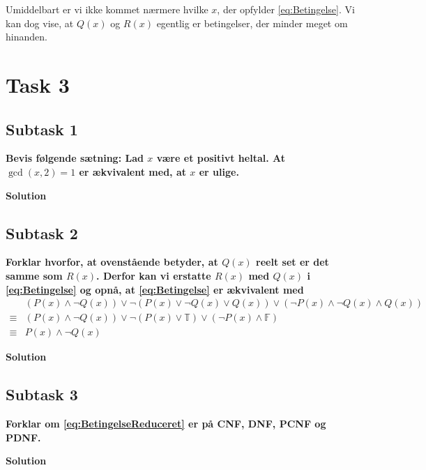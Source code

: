 Umiddelbart er vi ikke kommet nærmere hvilke $x$, der opfylder \eqref{eq:Betingelse}. Vi kan dog vise, at $Q(x)$ og $R(x)$ egentlig er betingelser, der minder meget om hinanden.


\section{Task 3}
\subsection{Subtask 1}
\noindent
\textbf{Bevis følgende sætning: Lad $x$ være et positivt heltal. At $\gcd(x,2)=1$ er ækvivalent med, at $x$ er ulige.}

\bigskip
\noindent
\textbf{Solution}

\subsection{Subtask 2}
\noindent
\textbf{Forklar hvorfor, at ovenstående betyder, at $Q(x)$ reelt set er det samme som $R(x)$. Derfor kan vi erstatte $R(x)$ med $Q(x)$ i \eqref{eq:Betingelse} og opnå, at \eqref{eq:Betingelse} er ækvivalent med
	\begin{align}\label{eq:BetingelseReduceret}
		&(P(x)\wedge \neg Q(x)) \vee \neg(P(x)\vee \neg Q(x) \vee Q(x)) \vee (\neg P(x) \wedge \neg Q(x) \wedge Q(x)) \nonumber\\ 
		\equiv& (P(x)\wedge \neg Q(x)) \vee \neg(P(x)\vee \mathbb{T}) \vee (\neg P(x) \wedge \mathbb{F}) \nonumber\\
		\equiv& P(x)\wedge \neg Q(x)
	\end{align}
}

\bigskip
\noindent
\textbf{Solution}

\subsection{Subtask 3}
\noindent
\textbf{Forklar om \eqref{eq:BetingelseReduceret} er på CNF, DNF, PCNF og PDNF.}

\bigskip
\noindent
\textbf{Solution}
